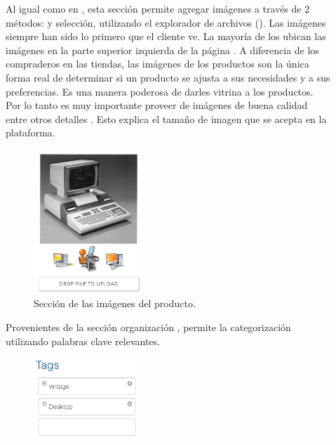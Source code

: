 \begin{description}
			\item [\multimediaForm]
				Al igual como en \shopifyNAME {}, esta sección permite agregar imágenes a través de 2 métodos: \dragdrop y selección, utilizando el explorador de archivos ().
				Las imágenes siempre han sido lo primero que el cliente ve. La mayoría de los \websitesINT ubican las imágenes en la parte superior izquierda de la página \cite{online_cxpartners_official_people_see_to_buy}.
				A diferencia de los compraderos en las tiendas, las imágenes de los productos son la única forma real de determinar si un producto se ajusta a sus necesidades y a sus preferencias. Es una manera poderosa de darles vitrina a los productos. Por lo tanto es muy importante proveer de imágenes de buena calidad entre otros detalles \cite{online_cxpartners_official_people_see_to_buy}. Esto explica el tamaño de imagen que se acepta en la plataforma.

				\begin{figure}[H]
					\centering
					\includegraphics[width=0.4\textwidth]{figuras/productos/details/write/component_multimedia.png}

					\caption{Sección de las imágenes del producto.}
					\label{figure:productos:details:write:component_multimedia}
				\end{figure}
				
			\item [\tagsForm]
				Provenientes de la sección organización , permite la categorización utilizando palabras clave relevantes.

				\begin{figure}[H]
					\centering
					\includegraphics[width=0.4\textwidth]{figuras/productos/details/write/component_tags.png}


\end{figure}
\end{description}

